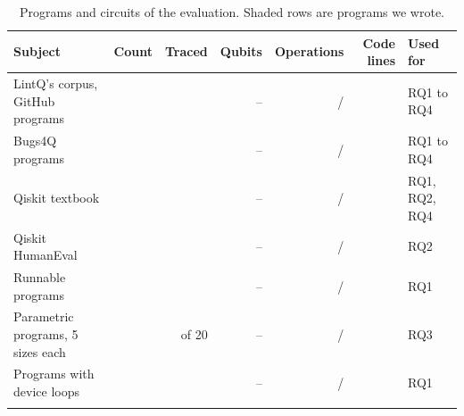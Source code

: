 \begin{table}[t]
  \centering
  \caption{Programs and circuits of the evaluation. Shaded rows are programs we wrote.}
  \label{tab:b-subjects}
  \footnotesize\setlength{\tabcolsep}{4pt}\renewcommand{\arraystretch}{1.05}
  \newcommand{\sep}{\arrayrulecolor{black!25}\hline\arrayrulecolor{black}}
  \begin{tabularx}{\textwidth}{@{}>{\raggedright\arraybackslash}X r r r r r >{\raggedright\arraybackslash}p{2.6cm}@{}}
    \toprule
    \rowcolor{black!8}\textbf{Subject} & \textbf{Count} & \textbf{Traced} & \textbf{Qubits} & \textbf{Operations} & \textbf{Code lines} &
      \textbf{Used for} \\
    \midrule
    LintQ's corpus, GitHub programs & \numSubjLintqCount{} & \numSubjLintqTraced{} & \numSubjLintqMinQubits{}--\numSubjLintqMaxQubits{} &
      \numSubjLintqMedianOps{} / \numSubjLintqMaxOps{} & \numSubjLintqMedianLines{} & RQ1 to RQ4 \\ \sep
    Bugs4Q programs & \numSubjBugsCount{} & \numSubjBugsTraced{} & \numSubjBugsMinQubits{}--\numSubjBugsMaxQubits{} &
      \numSubjBugsMedianOps{} / \numSubjBugsMaxOps{} & \numSubjBugsMedianLines{} & RQ1 to RQ4 \\ \sep
    Qiskit textbook & \numSubjTextCount{} & \numSubjTextTraced{} & \numSubjTextMinQubits{}--\numSubjTextMaxQubits{} &
      \numSubjTextMedianOps{} / \numSubjTextMaxOps{} & \numSubjTextMedianLines{} & RQ1, RQ2, RQ4 \\ \sep
    Qiskit HumanEval & \numSubjQheCount{} & \numSubjQheTraced{} & \numSubjQheMinQubits{}--\numSubjQheMaxQubits{} &
      \numSubjQheMedianOps{} / \numSubjQheMaxOps{} & \numSubjQheMedianLines{} & RQ2 \\ \sep
    \rowcolor{blue!7}Runnable programs & \numSubjDevCount{} & \numSubjDevTraced{} & \numSubjDevMinQubits{}--\numSubjDevMaxQubits{} &
      \numSubjDevMedianOps{} / \numSubjDevMaxOps{} & \numSubjDevMedianLines{} & RQ1 \\ \sep
    \rowcolor{blue!7}Parametric programs, 5 sizes each & \numSubjParamCount{} & \numSubjParamTraced{} of 20 &
      \numSubjParamMinQubits{}--\numSubjParamMaxQubits{} & \numSubjParamMedianOps{} / \numSubjParamMaxOps{} &
      \numSubjParamMedianLines{} & RQ3 \\ \sep
    \rowcolor{blue!7}Programs with device loops & \numSubjCfCount{} & \numSubjCfTraced{} & \numSubjCfMinQubits{}--\numSubjCfMaxQubits{} &
      \numSubjCfMedianOps{} / \numSubjCfMaxOps{} & \numSubjCfMedianLines{} & RQ1 \\ \sep

\end{tabularx}
\end{table}
